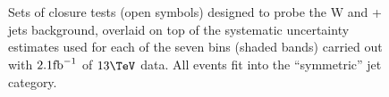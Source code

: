 \clearpage
\begin{figure}[h!]
  \begin{center}
     ~~
     \\
     ~~
     \\
    \caption{Sets of closure tests (open symbols) designed to probe
      the W and \ttbar + jets background, overlaid on top of
      the systematic uncertainty estimates used for each of the seven
      \scalht bins (shaded bands) carried out with $2.1\ifb$ of
      $13\tev$ data. All events fit into the ``symmetric'' jet
      category.}
    \label{fig:ttWclosureDataSym}
  \end{center} 
\end{figure}

